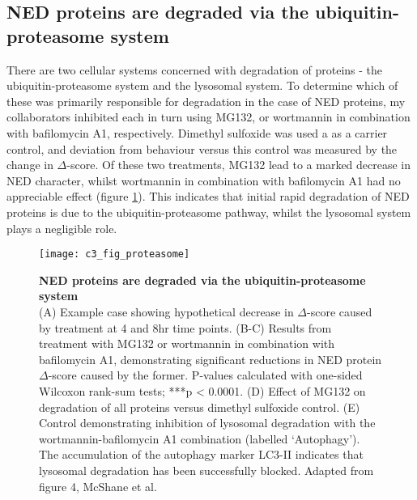 \documentclass[a4paper,11pt,twoside,openright]{scrbook}
\begin{document}
\subsection{NED proteins are degraded via the ubiquitin-proteasome system}
There are two cellular systems concerned with degradation of proteins - the
ubiquitin-proteasome system and the lysosomal system. To determine which of
these was primarily responsible for degradation in the case of NED proteins, my
collaborators inhibited each in turn using MG132, or wortmannin in combination
with bafilomycin A1, respectively. Dimethyl sulfoxide was used a as a carrier
control, and deviation from behaviour versus this control was measured by the
change in $\Delta$-score. Of these two treatments, MG132 lead to a marked
decrease in NED character, whilst wortmannin in combination with bafilomycin A1
had no appreciable effect (figure \ref{figure:proteasome}). This indicates that
initial rapid degradation of NED proteins is due to the ubiquitin-proteasome
pathway, whilst the lysosomal system plays a negligible role.

\begin{figure}[h]
    \texttt{[image: c3\_fig\_proteasome]}
    \caption[NED proteins are degraded via the ubiquitin-proteasome
    system]{\sffamily \textbf{NED proteins are degraded via the
    ubiquitin-proteasome system} \\ \small (A) Example case showing hypothetical
    decrease in $\Delta$-score caused by treatment at 4 and 8hr time points.
    (B-C) Results from treatment with MG132 or wortmannin in combination with
    bafilomycin A1, demonstrating significant reductions in NED protein
    $\Delta$-score caused by the former. P-values calculated with one-sided
    Wilcoxon rank-sum tests; ***p < 0.0001. (D) Effect of MG132 on degradation
    of all proteins versus dimethyl sulfoxide control. (E) Control demonstrating
    inhibition of lysosomal degradation with the wortmannin-bafilomycin A1
    combination (labelled `Autophagy'). The accumulation of the autophagy marker
    LC3-II indicates that lysosomal degradation has been successfully blocked.
    Adapted from figure 4, McShane et al.\cite{McShane2016}}
    \label{figure:proteasome}
\end{figure}
\end{document}
